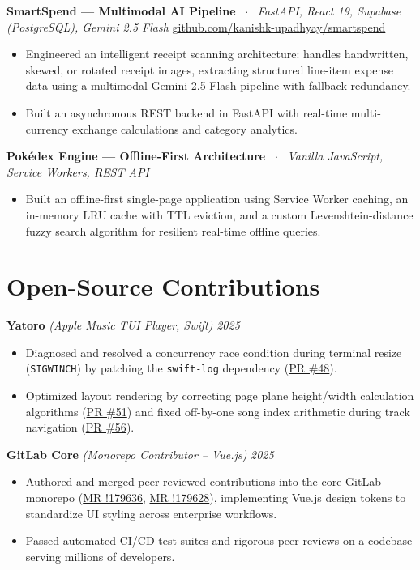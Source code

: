 \documentclass[10pt,a4paper]{article}
\begin{document}
\textbf{SmartSpend — Multimodal AI Pipeline} \ $\cdot$ \ \textit{FastAPI, React 19, Supabase (PostgreSQL), Gemini 2.5 Flash} \hfill \href{https://github.com/kanishk-upadhyay/smartspend}{github.com/kanishk-upadhyay/smartspend}
\begin{itemize}
    \item Engineered an intelligent receipt scanning architecture: handles handwritten, skewed, or rotated receipt images, extracting structured line-item expense data using a multimodal Gemini 2.5 Flash pipeline with fallback redundancy.
    \item Built an asynchronous REST backend in FastAPI with real-time multi-currency exchange calculations and category analytics.
\end{itemize}

\textbf{Pokédex Engine — Offline-First Architecture} \ $\cdot$ \ \textit{Vanilla JavaScript, Service Workers, REST API}
\begin{itemize}
    \item Built an offline-first single-page application using Service Worker caching, an in-memory LRU cache with TTL eviction, and a custom Levenshtein-distance fuzzy search algorithm for resilient real-time offline queries.
\end{itemize}

\section{Open-Source Contributions}
\textbf{Yatoro} \textit{(Apple Music TUI Player, Swift)} \hfill \textit{2025}
\begin{itemize}
    \item Diagnosed and resolved a concurrency race condition during terminal resize (\texttt{SIGWINCH}) by patching the \texttt{swift-log} dependency (\href{https://github.com/jayadamsmorgan/Yatoro/pull/48}{PR \#48}).
    \item Optimized layout rendering by correcting page plane height/width calculation algorithms (\href{https://github.com/jayadamsmorgan/Yatoro/pull/51}{PR \#51}) and fixed off-by-one song index arithmetic during track navigation (\href{https://github.com/jayadamsmorgan/Yatoro/pull/56}{PR \#56}).
\end{itemize}

\textbf{GitLab Core} \textit{(Monorepo Contributor -- Vue.js)} \hfill \textit{2025}
\begin{itemize}
    \item Authored and merged peer-reviewed contributions into the core GitLab monorepo (\href{https://gitlab.com/gitlab-org/gitlab/-/merge_requests/179636}{MR !179636}, \href{https://gitlab.com/gitlab-org/gitlab/-/merge_requests/179628}{MR !179628}), implementing Vue.js design tokens to standardize UI styling across enterprise workflows.
    \item Passed automated CI/CD test suites and rigorous peer reviews on a codebase serving millions of developers.
\end{itemize}
\end{document}
